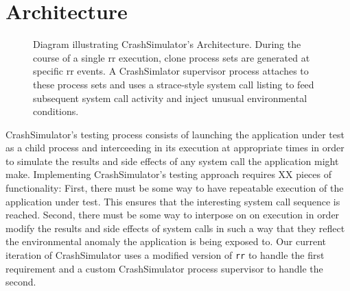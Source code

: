 \section{Architecture}
\label{SEC:architecture}

\begin{figure}[t]
  \center{}
  \caption{Diagram illustrating CrashSimulator's Architecture.  During the
    course of a single rr execution, clone process sets are generated at
    specific rr events.  A CrashSimlator supervisor process attaches to
    these process sets and uses a strace-style system call listing to feed
    subsequent system call activity and inject unusual environmental
    conditions.}
  \label{figure:architecture}
\end{figure}

CrashSimulator's testing process
consists of launching the application under test as a child process and
interceeding in its execution at appropriate times in order to simulate the
results and side effects of any system call the application might make.
Implementing CrashSimulator's testing approach requires XX pieces of
functionality:  First, there must be some way to have
repeatable execution of the application under test. This ensures that
the interesting system call sequence is reached.  Second, there must be
some way to interpose on on execution in order modify the results and side
effects of system calls in such a way that they reflect the environmental
anomaly the application is being exposed to.  Our current iteration of
CrashSimulator uses a modified version of {\tt rr} to handle the first
requirement and a custom CrashSimulator process supervisor to handle the
second.

